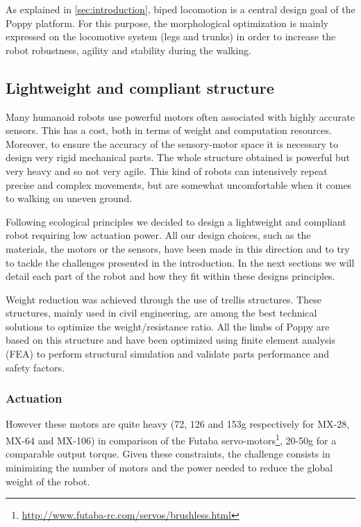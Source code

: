 As explained in \ref{sec:introduction}, biped locomotion is a central design goal of the Poppy platform.
For this purpose, the morphological optimization is mainly expressed on the locomotive system (legs and trunks) in order to increase the robot robustness, agility and stability during the walking.


\subsection{Lightweight and compliant structure} %
\label{sub:a_ligthweight_and_compliant_structre}
Many humanoid robots use powerful motors often associated with highly accurate sensors.
This has a cost, both in terms of weight and computation resources.
Moreover, to ensure the accuracy of the sensory-motor space it is necessary to design very rigid mechanical parts.
The whole structure obtained is powerful but very heavy and so not very agile.
This kind of robots can intensively repeat precise and complex movements, but are somewhat uncomfortable when it comes to walking on uneven ground.

Following ecological principles \cite{pfeifer2005new} we decided to design a lightweight and compliant robot requiring low actuation power.
All our design choices, such as the materials, the motors or the sensors, have been made in this direction and to try to tackle the challenges presented in the introduction.
In the next sections we will detail each part of the robot and how they fit within these designs principles.

Weight reduction was achieved through the use of trellis structures.
These structures, mainly used in civil engineering, are among the best technical solutions to optimize the weight/resistance ratio.
All the limbs of Poppy are based on this structure and have been optimized using finite element analysis (FEA) to perform structural simulation and validate parts performance and safety factors.


\subsubsection{Actuation} %
\label{ssub:robot_actuation}
However these motors are quite heavy (72, 126 and 153g respectively for MX-28, MX-64 and MX-106) in comparison of the Futaba servo-motors\footnote{\url{http://www.futaba-rc.com/servos/brushless.html}}, 20-50g for a comparable output torque. Given these constraints, the challenge consists in minimizing the number of motors and the power needed to reduce the global weight of the robot.

